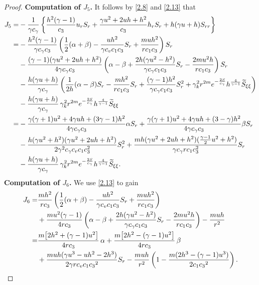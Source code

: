 \documentclass[11pt,reqno]{article}
\numberwithin{equation}{section}
\begin{document}
\begin{proof}
\noindent\textbf{Computation of $J_5$.}
It follows by \eqref{2.8} and \eqref{2.13} that
 \begin{align}
J_5
= &-\frac{1}{\gamma c_\gamma}\left\{\frac{h^2(\gamma-1)}{c_3}u_rS_r+\frac{\gamma u^2+2uh+h^2}{c_3}h_rS_r+h(\gamma u+h)S_{rr}\right\}\notag\\
=& -\frac{h^2(\gamma-1)}{\gamma c_\gamma c_3}\left(\frac12(\alpha+\beta)-\frac{uh^2}{\gamma c_v c_1c_3}S_r+\frac{muh^2}{rc_1c_3}\right)S_r \notag\\
& -\frac{(\gamma-1)(\gamma u^2+2uh+h^2)}{4\gamma c_\gamma c_3}\left(\alpha-\beta+\frac{2h(\gamma u^2-h^2)}{\gamma c_\gamma c_1c_3}S_r-\frac{2mu^2h}{rc_1c_3}\right)S_r \notag\\
& -\frac{h(\gamma u+h)}{\gamma c_\gamma}\left(\frac{1}{2h}(\alpha-\beta)S_r-\frac{mh^2}{rc_1c_3}S_r+\frac{(\gamma-1)h^2}{\gamma c_\gamma c_1c_3}S_r^2+\gamma_k^2r^{2m}e^{-\frac{2S}{c_\gamma}}h^{\frac{4}{\gamma-1}} \widetilde{S}_{\xi\xi}\right)\notag\\
& -\frac{h(\gamma u+h)}{\gamma c_\gamma}\,\gamma_k^2 r^{2m}e^{-\frac{2S}{c_\gamma}}h^{\frac{4}{\gamma-1}}\widetilde{S}_{\xi\xi}\notag\\
=&- \frac{\gamma(\gamma+1)u^2+4\gamma uh + (3\gamma-1)h^2}{4\gamma c_\gamma c_3}\alpha S_r
+ \frac{\gamma(\gamma+1)u^2+4\gamma uh + (3-\gamma)h^2}{4\gamma c_\gamma c_3} \beta S_r\notag\\
&  -\frac{h(\gamma u^2 + h^2)(\gamma u^2+2uh+h^2)}{2\gamma^2 c_\gamma c_v c_1c_3^2} S_r^2
+\frac{mh(\gamma u^2+2uh+h^2)(\frac{\gamma-1}{2}u^2+h^2)}{\gamma c_\gamma rc_1c_3^2} S_r\notag\\
& -\frac{h(\gamma u+h)}{\gamma c_\gamma}\,\gamma_k^2 r^{2m}e^{-\frac{2S}{c_\gamma}}h^{\frac{4}{\gamma-1}}\widetilde{S}_{\xi\xi}. \notag
 \end{align}
\noindent\textbf{Computation of $J_6$.}
We use \eqref{2.13} to gain
 \begin{align}
J_6
=& \frac{m h^2}{rc_3}\left( \frac12(\alpha+\beta) - \frac{uh^2}{\gamma c_v c_1 c_3}S_r + \frac{m u h^2}{rc_1 c_3} \right) \nonumber\\
  & +\frac{m u^2(\gamma-1)}{4rc_3}\left( \alpha-\beta + \frac{2h(\gamma u^2-h^2)}{\gamma c_\gamma c_1 c_3}S_r - \frac{2m u^2 h}{rc_1 c_3} \right) -\frac{m u h}{r^2}\nonumber\\
=& \frac{m\big[2h^2 + (\gamma-1)u^2\big]}{4r c_3} \,\alpha + \frac{m\big[2h^2 - (\gamma-1)u^2\big]}{4r c_3} \,\beta \nonumber\\
  &  + \frac{muh(\gamma u^3-uh^2-2h^3)}{2\gamma r c_vc_1 {c_3}^2}  S_r - \frac{m u h}{r^2}\left( 1 - \frac{m(2h^3 - (\gamma-1)u^3)}{2 c_1 {c_3}^2} \right). \notag
 \end{align}


\end{proof}
\end{document}
